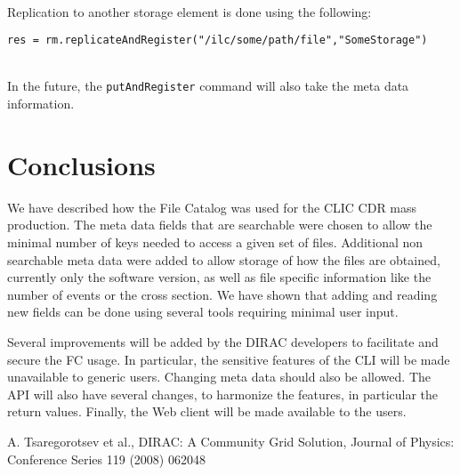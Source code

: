 \documentclass[11pt,a4paper]{scrartcl}
\begin{document}
~\\

Replication to another storage element is done using the following:
\begin{lstlisting}
res = rm.replicateAndRegister("/ilc/some/path/file","SomeStorage")
\end{lstlisting}

~\\

In the future, the \lstinline|putAndRegister| command will also take the meta
data information.

\section{Conclusions}
We have described how the File Catalog was used for the CLIC CDR mass
production. The meta data fields that are searchable were chosen to allow the
minimal number of keys needed to access a given set of files. Additional non
searchable meta data were added to allow storage of how the files are obtained,
currently only the software version, as well as file specific information like
the number of events or the cross section. We have shown that adding and
reading new fields can be done using several tools requiring minimal user input.

Several improvements will be added by the DIRAC developers to facilitate and
secure the FC usage. In particular, the sensitive features of the CLI will be
made unavailable to generic users. Changing meta data should also be allowed.
The API will also have several changes, to harmonize the features, in particular
the return values. Finally, the Web client will be made available to the users.

\begin{thebibliography}{9}
 A. Tsaregorotsev et al., DIRAC: A Community Grid Solution,
Journal of Physics: Conference Series 119 (2008) 062048
\end{thebibliography}
\end{document}
